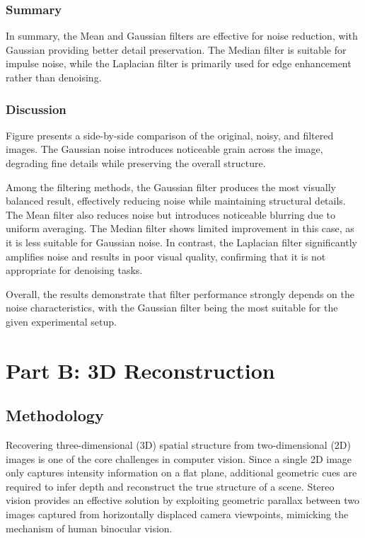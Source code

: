\documentclass[a4paper,12pt]{article}
\begin{document}
\vspace{2mm}

\subsubsection{Summary}
In summary, the Mean and Gaussian filters are effective for noise reduction, with Gaussian providing better detail preservation. The Median filter is suitable for impulse noise, while the Laplacian filter is primarily used for edge enhancement rather than denoising.
\subsubsection{Discussion}
Figure presents a side-by-side comparison of the original, noisy, and filtered images. The Gaussian noise introduces noticeable grain across the image, degrading fine details while preserving the overall structure.

Among the filtering methods, the Gaussian filter produces the most visually balanced result, effectively reducing noise while maintaining structural details. The Mean filter also reduces noise but introduces noticeable blurring due to uniform averaging. The Median filter shows limited improvement in this case, as it is less suitable for Gaussian noise. In contrast, the Laplacian filter significantly amplifies noise and results in poor visual quality, confirming that it is not appropriate for denoising tasks.

Overall, the results demonstrate that filter performance strongly depends on the noise characteristics, with the Gaussian filter being the most suitable for the given experimental setup.

\section{Part B: 3D Reconstruction}
\subsection{Methodology}
Recovering three-dimensional (3D) spatial structure from two-dimensional (2D) images is one of the core challenges in computer vision. Since a single 2D image only captures intensity information on a flat plane, additional geometric cues are required to infer depth and reconstruct the true structure of a scene. Stereo vision provides an effective solution by exploiting geometric parallax between two images captured from horizontally displaced camera viewpoints, mimicking the mechanism of human binocular vision.
\end{document}
